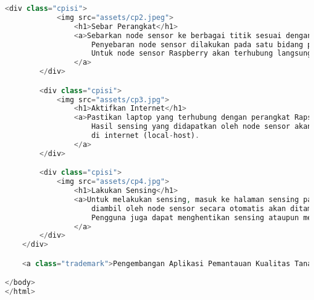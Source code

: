 \begin{lstlisting}[language=PHP, caption=skripsi\_carapakai.blade.php]
        <div class="cpisi">
            <img src="assets/cp2.jpeg">
                <h1>Sebar Perangkat</h1>
                <a>Sebarkan node sensor ke berbagai titik sesuai dengan topologi yang digunakan.
                    Penyebaran node sensor dilakukan pada satu bidang petak tanah sawah.
                    Untuk node sensor Raspberry akan terhubung langsung dengan laptop.
                </a>
        </div>

        <div class="cpisi">
            <img src="assets/cp3.jpg">
                <h1>Aktifkan Internet</h1>
                <a>Pastikan laptop yang terhubung dengan perangkat Rapsberry terhubung dengan internet.
                    Hasil sensing yang didapatkan oleh node sensor akan dikirimkan ke Rapsberry lalu disimpan
                    di internet (local-host).
                </a>
        </div>

        <div class="cpisi">
            <img src="assets/cp4.jpg">
                <h1>Lakukan Sensing</h1>
                <a>Untuk melakukan sensing, masuk ke halaman sensing pada website. Hasil sensing yang 
                    diambil oleh node sensor secara otomatis akan ditampilkan pada halaman tersebut.
                    Pengguna juga dapat menghentikan sensing ataupun memulai kembali sensing pada halaman tersebut.
                </a>
        </div>      
    </div>

    <a class="trademark">Pengembangan Aplikasi Pemantauan Kualitas Tanah Sawah Berbasis WSN</a>

</body>
</html>
\end{lstlisting}


